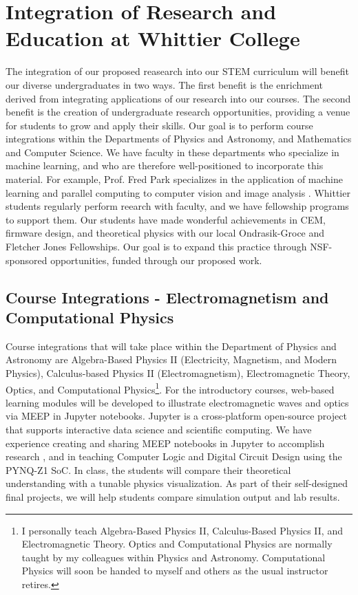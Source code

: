 \documentclass[11pt]{amsart}
\begin{document}
\section{Integration of Research and Education at Whittier College}
\label{sec:int}

The integration of our proposed reasearch into our STEM curriculum will benefit our diverse undergraduates in two ways.  The first benefit is the enrichment derived from integrating applications of our research into our courses.  The second benefit is the creation of undergraduate research opportunities, providing a venue for students to grow and apply their skills.  Our goal is to perform course integrations within the Departments of Physics and Astronomy, and Mathematics and Computer Science.  We have faculty in these departments who specialize in machine learning, and who are therefore well-positioned to incorporate this material.  For example, Prof. Fred Park specializes in the application of machine learning and parallel computing to computer vision and image analysis \cite{SHI201528,doi:10.1137/20M1337041}.  Whittier students regularly perform reearch with faculty, and we have fellowship programs to support them.  Our students have made wonderful achievements in CEM, firmware design, and theoretical physics with our local Ondrasik-Groce and Fletcher Jones Fellowships.  Our goal is to expand this practice through NSF-sponsored opportunities, funded through our proposed work.

\subsection{Course Integrations - Electromagnetism and Computational Physics}
\label{sec:integration}

Course integrations that will take place within the Department of Physics and Astronomy are Algebra-Based Physics II (Electricity, Magnetism, and Modern Physics), Calculus-based Physics II (Electromagnetism), Electromagnetic Theory, Optics, and Computational Physics\footnote{I personally teach Algebra-Based Physics II, Calculus-Based Physics II, and Electromagnetic Theory.  Optics and Computational Physics are normally taught by my colleagues within Physics and Astronomy.  Computational Physics will soon be handed to myself and others as the usual instructor retires.}.  For the introductory courses, web-based learning modules will be developed to illustrate electromagnetic waves and optics via MEEP in Jupyter notebooks.  Jupyter is a cross-platform open-source project that supports interactive data science and scientific computing.  We have experience creating and sharing MEEP notebooks in Jupyter to accomplish research \cite{electronics10040415}, and in teaching Computer Logic and Digital Circuit Design using the PYNQ-Z1 SoC. In class, the students will compare their theoretical understanding with a tunable physics visualization.  As part of their self-designed final projects, we will help students compare simulation output and lab results.
\end{document}

